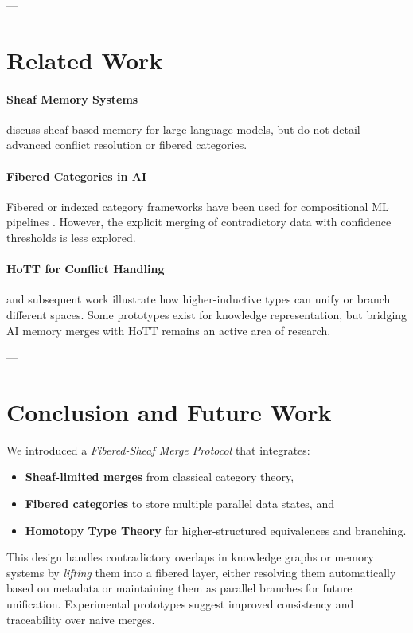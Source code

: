 \documentclass{article}
\begin{document}
---

\section{Related Work}
\label{sec:related}

\paragraph{Sheaf Memory Systems}  
\citet{sheafmemory2023design} discuss sheaf-based memory for large language models, but do not detail advanced conflict resolution or fibered categories.

\paragraph{Fibered Categories in AI}  
Fibered or indexed category frameworks have been used for compositional ML pipelines \citep{fong2019invitation}. However, the explicit merging of contradictory data with confidence thresholds is less explored.

\paragraph{HoTT for Conflict Handling}  
\citet{hottbook} and subsequent work illustrate how higher-inductive types can unify or branch different spaces. Some prototypes exist for knowledge representation, but bridging AI memory merges with HoTT remains an active area of research.

---

\section{Conclusion and Future Work}
\label{sec:conclusion}

We introduced a \emph{Fibered-Sheaf Merge Protocol} that integrates:
\begin{itemize}
    \item \textbf{Sheaf-limited merges} from classical category theory,  
    \item \textbf{Fibered categories} to store multiple parallel data states, and  
    \item \textbf{Homotopy Type Theory} for higher-structured equivalences and branching.  
\end{itemize}

This design handles contradictory overlaps in knowledge graphs or memory systems by \emph{lifting} them into a fibered layer, either resolving them automatically based on metadata or maintaining them as parallel branches for future unification. Experimental prototypes suggest improved consistency and traceability over naive merges.
\end{document}
